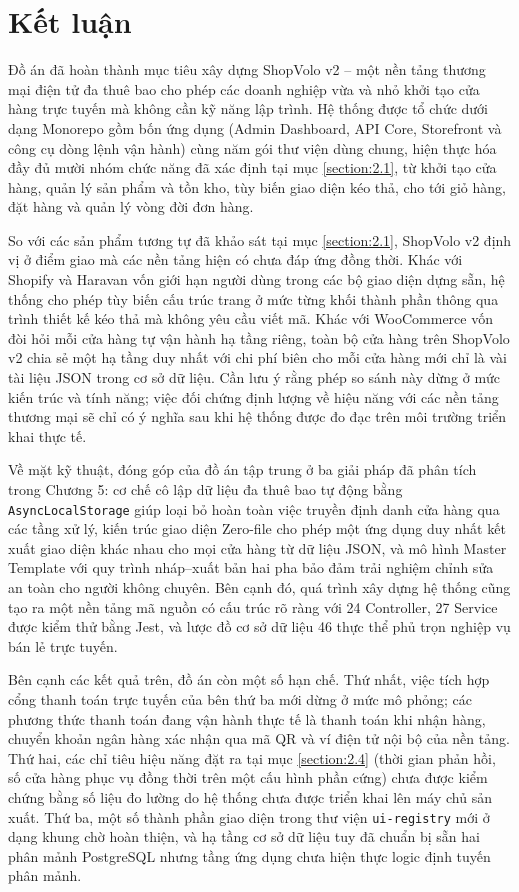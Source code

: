 \documentclass[../main.tex]{subfiles}
\begin{document}
\section{Kết luận}
\label{section:6.1}

Đồ án đã hoàn thành mục tiêu xây dựng ShopVolo v2 -- một nền tảng thương mại điện tử đa thuê bao cho phép các doanh nghiệp vừa và nhỏ khởi tạo cửa hàng trực tuyến mà không cần kỹ năng lập trình. Hệ thống được tổ chức dưới dạng Monorepo gồm bốn ứng dụng (Admin Dashboard, API Core, Storefront và công cụ dòng lệnh vận hành) cùng năm gói thư viện dùng chung, hiện thực hóa đầy đủ mười nhóm chức năng đã xác định tại mục \ref{section:2.1}, từ khởi tạo cửa hàng, quản lý sản phẩm và tồn kho, tùy biến giao diện kéo thả, cho tới giỏ hàng, đặt hàng và quản lý vòng đời đơn hàng.

So với các sản phẩm tương tự đã khảo sát tại mục \ref{section:2.1}, ShopVolo v2 định vị ở điểm giao mà các nền tảng hiện có chưa đáp ứng đồng thời. Khác với Shopify và Haravan vốn giới hạn người dùng trong các bộ giao diện dựng sẵn, hệ thống cho phép tùy biến cấu trúc trang ở mức từng khối thành phần thông qua trình thiết kế kéo thả mà không yêu cầu viết mã. Khác với WooCommerce vốn đòi hỏi mỗi cửa hàng tự vận hành hạ tầng riêng, toàn bộ cửa hàng trên ShopVolo v2 chia sẻ một hạ tầng duy nhất với chi phí biên cho mỗi cửa hàng mới chỉ là vài tài liệu JSON trong cơ sở dữ liệu. Cần lưu ý rằng phép so sánh này dừng ở mức kiến trúc và tính năng; việc đối chứng định lượng về hiệu năng với các nền tảng thương mại sẽ chỉ có ý nghĩa sau khi hệ thống được đo đạc trên môi trường triển khai thực tế.

Về mặt kỹ thuật, đóng góp của đồ án tập trung ở ba giải pháp đã phân tích trong Chương 5: cơ chế cô lập dữ liệu đa thuê bao tự động bằng \texttt{AsyncLocalStorage} giúp loại bỏ hoàn toàn việc truyền định danh cửa hàng qua các tầng xử lý, kiến trúc giao diện Zero-file cho phép một ứng dụng duy nhất kết xuất giao diện khác nhau cho mọi cửa hàng từ dữ liệu JSON, và mô hình Master Template với quy trình nháp--xuất bản hai pha bảo đảm trải nghiệm chỉnh sửa an toàn cho người không chuyên. Bên cạnh đó, quá trình xây dựng hệ thống cũng tạo ra một nền tảng mã nguồn có cấu trúc rõ ràng với 24 Controller, 27 Service được kiểm thử bằng Jest, và lược đồ cơ sở dữ liệu 46 thực thể phủ trọn nghiệp vụ bán lẻ trực tuyến.

Bên cạnh các kết quả trên, đồ án còn một số hạn chế. Thứ nhất, việc tích hợp cổng thanh toán trực tuyến của bên thứ ba mới dừng ở mức mô phỏng; các phương thức thanh toán đang vận hành thực tế là thanh toán khi nhận hàng, chuyển khoản ngân hàng xác nhận qua mã QR và ví điện tử nội bộ của nền tảng. Thứ hai, các chỉ tiêu hiệu năng đặt ra tại mục \ref{section:2.4} (thời gian phản hồi, số cửa hàng phục vụ đồng thời trên một cấu hình phần cứng) chưa được kiểm chứng bằng số liệu đo lường do hệ thống chưa được triển khai lên máy chủ sản xuất. Thứ ba, một số thành phần giao diện trong thư viện \texttt{ui-registry} mới ở dạng khung chờ hoàn thiện, và hạ tầng cơ sở dữ liệu tuy đã chuẩn bị sẵn hai phân mảnh PostgreSQL nhưng tầng ứng dụng chưa hiện thực logic định tuyến phân mảnh.
\end{document}
